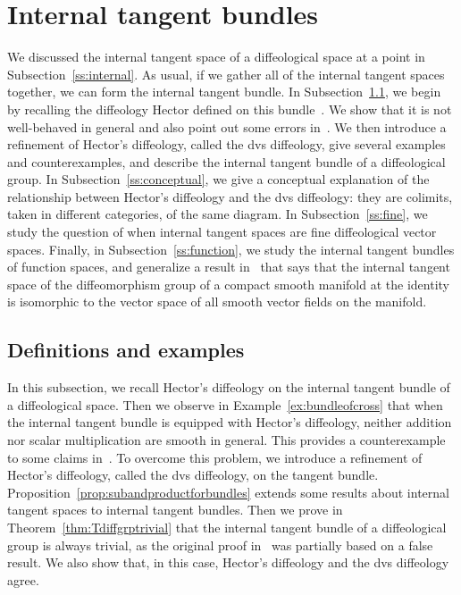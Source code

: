 \documentclass[12pt]{amsart}
\theoremstyle{remark}
\begin{document}
\section{Internal tangent bundles}\label{s:bundle}

We discussed the internal tangent space of a diffeological space at a point in Subsection~\ref{ss:internal}.
As usual, if we gather all of the internal tangent spaces together, we can form the internal tangent bundle.
In Subsection~\ref{ss:dvs}, we begin by recalling the diffeology Hector defined on this bundle~\cite{He}.
We show that it is not well-behaved in general
and also point out some errors in~\cite{He,HM,La}.
We then introduce a refinement of Hector's diffeology, called the dvs diffeology,
give several examples and counterexamples, and describe the internal tangent bundle
of a diffeological group.
In Subsection~\ref{ss:conceptual}, we give a conceptual explanation of the
relationship between Hector's diffeology and the dvs diffeology:  they are
colimits, taken in different categories, of the same diagram.
In Subsection~\ref{ss:fine}, we study the question of when internal tangent spaces
are fine diffeological vector spaces.
Finally, in Subsection~\ref{ss:function}, we study the internal tangent bundles of function spaces,
and generalize a result in~\cite{He,HM} that says that the internal tangent space of
the diffeomorphism group of a compact smooth manifold at the identity is isomorphic
to the vector space of all smooth vector fields on the manifold.

\subsection{Definitions and examples}\label{ss:dvs}

In this subsection, we recall Hector's diffeology on the internal tangent bundle
of a diffeological space.  Then we observe in Example~\ref{ex:bundleofcross} that
when the internal tangent bundle is equipped with Hector's diffeology,
neither addition nor scalar multiplication are smooth in general.
This provides a counterexample to some claims in~\cite{He,HM,La}.
To overcome this problem, we introduce a refinement of Hector's diffeology,
called the dvs diffeology, on the tangent bundle.
Proposition~\ref{prop:subandproductforbundles} extends some results
about internal tangent spaces to internal tangent bundles.
Then we prove in Theorem~\ref{thm:Tdiffgrptrivial}
that the internal tangent bundle of a diffeological group is always trivial,
as the original proof in~\cite{HM} was partially based on a false result.
We also show that, in this case, Hector's diffeology and the dvs diffeology agree.
\end{document}
